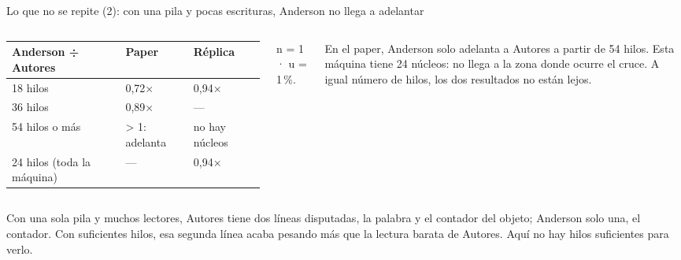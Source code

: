 \begin{frame}{Lo que no se repite (2): con una pila y pocas escrituras, Anderson no llega a adelantar}
  \begin{columns}[T,onlytextwidth]
    \footnotesize
    \begin{tabular}{@{}p{30mm}p{17mm}p{18mm}@{}}
      \toprule
      \textbf{Anderson ÷ Autores} & \textbf{Paper} & \textbf{Réplica}\\
      \midrule
      18 hilos & 0,72× & 0,94×\\
      36 hilos & 0,89× & —\\
      54 hilos o más & > 1: adelanta & no hay núcleos\\
      24 hilos (toda la máquina) & — & 0,94×\\
      \bottomrule
    \end{tabular}\par\vspace{1mm}
    \scriptsize n = 1 · u = 1\,\%.
    \begin{idea}\footnotesize En el paper, Anderson solo adelanta a Autores a partir de 54 hilos. Esta máquina tiene 24 núcleos: no llega a la zona donde ocurre el cruce. A igual número de hilos, los dos resultados no están lejos.\end{idea}
  \end{columns}
  \vspace{3mm}
  \begin{porque}
    Con una sola pila y muchos lectores, Autores tiene dos líneas disputadas, la palabra y el contador del objeto; Anderson solo una, el contador. Con suficientes hilos, esa segunda línea acaba pesando más que la lectura barata de Autores. Aquí no hay hilos suficientes para verlo.
  \end{porque}
\end{frame}

